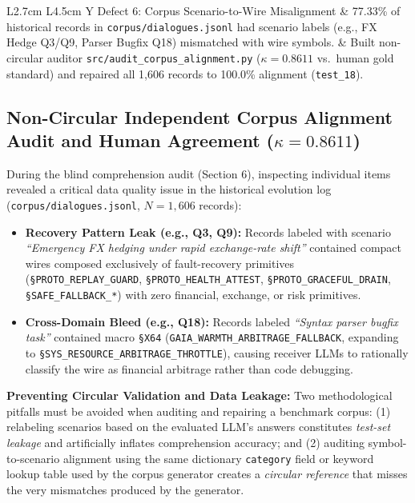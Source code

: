 \documentclass[9pt,a4paper]{extarticle}
\begin{document}
\begin{table}[h!]
\begin{tabularx}{\textwidth}{L{2.7cm} L{4.5cm} Y}
Defect 6: Corpus Scenario-to-Wire Misalignment & 77.33\% of historical records in \texttt{corpus/\allowbreak dialogues.jsonl} had scenario labels (e.g., FX Hedge Q3/Q9, Parser Bugfix Q18) mismatched with wire symbols. & Built non-circular auditor \texttt{src/audit\_\allowbreak corpus\_\allowbreak alignment.py} ($\kappa = 0.8611$ vs.\ human gold standard) and repaired all 1,606 records to 100.0\% alignment (\texttt{test\_18}). \\
\bottomrule
\end{tabularx}
\end{table}

\subsection{Non-Circular Independent Corpus Alignment Audit and Human Agreement ($\kappa = 0.8611$)}
During the blind comprehension audit (Section 6), inspecting individual items revealed a critical data quality issue in the historical evolution log (\texttt{corpus/dialogues.jsonl}, $N=1{,}606$ records):
\begin{itemize}
  \item \textbf{Recovery Pattern Leak (e.g., Q3, Q9):} Records labeled with scenario \emph{``Emergency FX hedging under rapid exchange-rate shift''} contained compact wires composed exclusively of fault-recovery primitives (\texttt{\S PROTO\_\allowbreak REPLAY\_\allowbreak GUARD}, \texttt{\S PROTO\_\allowbreak HEALTH\_\allowbreak ATTEST}, \texttt{\S PROTO\_\allowbreak GRACEFUL\_\allowbreak DRAIN}, \texttt{\S SAFE\_\allowbreak FALLBACK\_*}) with zero financial, exchange, or risk primitives.
  \item \textbf{Cross-Domain Bleed (e.g., Q18):} Records labeled \emph{``Syntax parser bugfix task''} contained macro \texttt{\S X64} (\texttt{GAIA\_\allowbreak WARMTH\_\allowbreak ARBITRAGE\_\allowbreak FALLBACK}, expanding to \texttt{\S SYS\_\allowbreak RESOURCE\_\allowbreak ARBITRAGE\_\allowbreak THROTTLE}), causing receiver LLMs to rationally classify the wire as financial arbitrage rather than code debugging.
\end{itemize}

\textbf{Preventing Circular Validation and Data Leakage:} Two methodological pitfalls must be avoided when auditing and repairing a benchmark corpus: (1) relabeling scenarios based on the evaluated LLM's answers constitutes \emph{test-set leakage} and artificially inflates comprehension accuracy; and (2) auditing symbol-to-scenario alignment using the same dictionary \texttt{category} field or keyword lookup table used by the corpus generator creates a \emph{circular reference} that misses the very mismatches produced by the generator.
\end{document}
